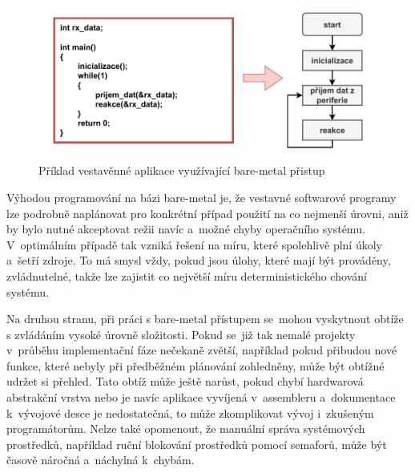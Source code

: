 \begin{figure}[h]
    \centering
    \includegraphics[width=1.00\textwidth]{obrazky-figures/bare_metal-1.pdf}
    
    \caption{Příklad vestavěnné aplikace využívající bare-metal přistup}
    \label{fig:bare-metal}
\end{figure}


Výhodou programování na bázi bare-metal je, že vestavné softwarové programy lze podrobně naplánovat pro konkrétní případ použití na co nejmenší úrovni, aniž by bylo nutné akceptovat režii navíc a~možné chyby operačního systému. V~optimálním případě tak vzniká řešení na míru, které spolehlivě plní úkoly a~šetří zdroje. To má smysl vždy, pokud jsou úlohy, které mají být prováděny, zvládnutelné, takže lze zajistit co největší míru deterministického chování systému.~\cite{sysgo_baremetal_vs_rtos}

Na druhou stranu, při práci s bare-metal přístupem se~mohou vyskytnout obtíže s zvládáním vysoké úrovně složitosti. Pokud se~již tak nemalé projekty v~průběhu implementační fáze nečekaně zvětší, například pokud přibudou nové funkce, které nebyly při předběžném plánování zohledněny, může být obtížné udržet si přehled. Tato obtíž může ještě narůst, pokud chybí hardwarová abstrakční vrstva nebo je navíc aplikace vyvíjená v~assembleru a~dokumentace k~vývojové desce je nedostatečná, to může zkomplikovat vývoj i~zkušeným programátorům. Nelze také opomenout, že manuální správa systémových prostředků, například ruční blokování prostředků pomocí semaforů, může být časově náročná a~náchylná k~chybám.~\cite{sysgo_baremetal_vs_rtos}

